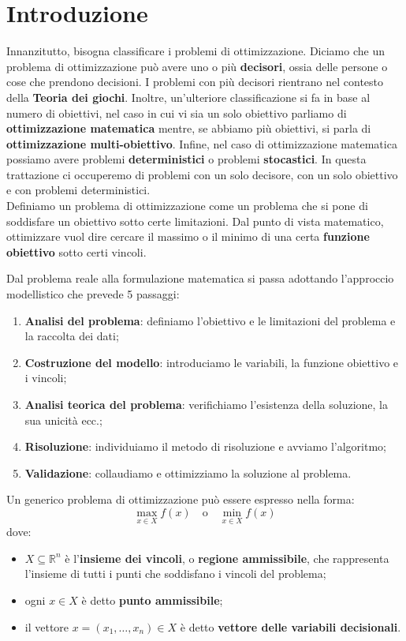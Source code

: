 

\chapter*{Introduzione}
Innanzitutto, bisogna classificare i problemi di ottimizzazione. Diciamo che un problema di ottimizzazione può avere uno o più \textbf{decisori}, ossia delle persone o cose che prendono decisioni. I problemi con più decisori rientrano nel contesto della \textbf{Teoria dei giochi}. 
Inoltre, un'ulteriore classificazione si fa in base al numero di obiettivi, nel caso in cui vi sia un solo obiettivo parliamo di \textbf{ottimizzazione matematica} mentre, se abbiamo più obiettivi, si parla di \textbf{ottimizzazione multi-obiettivo}. Infine, nel caso di ottimizzazione matematica possiamo avere problemi \textbf{deterministici} o problemi \textbf{stocastici}. In questa trattazione ci occuperemo di problemi con un solo decisore, con un solo obiettivo e con problemi deterministici.\\
Definiamo un problema di ottimizzazione come un problema che si pone di soddisfare un obiettivo sotto certe limitazioni. Dal punto di vista matematico, ottimizzare vuol dire cercare il massimo o il minimo di una certa \textbf{funzione obiettivo} sotto certi vincoli.

Dal problema reale alla formulazione matematica si passa adottando l'approccio modellistico che prevede 5 passaggi: 
\begin{enumerate}
    \item \textbf{Analisi del problema}: definiamo l'obiettivo e le limitazioni del problema e la raccolta dei dati;
    \item \textbf{Costruzione del modello}: introduciamo le variabili, la funzione obiettivo e i vincoli;
    \item \textbf{Analisi teorica del problema}: verifichiamo l'esistenza della soluzione, la sua unicità ecc.;
    \item \textbf{Risoluzione}: individuiamo il metodo di risoluzione e avviamo l'algoritmo;
    \item \textbf{Validazione}: collaudiamo e ottimizziamo la soluzione al problema.
\end{enumerate}

Un generico problema di ottimizzazione può essere espresso nella forma:
\[\max_{x \in X} f(x) \quad \text{o} \quad \min_{x \in X} f(x)\]
dove:
\begin{itemize}
    \item \( X \subseteq \mathbb{R}^n \) è l'\textbf{insieme dei vincoli}, o \textbf{regione ammissibile}, che rappresenta l'insieme di tutti i punti che soddisfano i vincoli del problema;
    \item ogni \( x \in X \) è detto \textbf{punto ammissibile};
    \item il vettore \( x = (x_1, \ldots, x_n) \in X \) è detto \textbf{vettore delle variabili decisionali}.
\end{itemize}


